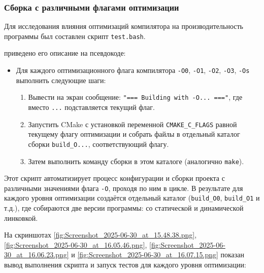 \subsubsection{Сборка с различными флагами оптимизации}

Для исследования влияния оптимизаций компилятора на производительность программы был составлен скрипт \texttt{test.bash}.

\vspace{.3cm}

 приведено его описание на псевдокоде:
\begin{itemize}
\item Для каждого оптимизационного флага компилятора \texttt{-O0}, \texttt{-O1}, \texttt{-O2}, \texttt{-O3}, \texttt{-Os} выполнить следующие шаги:
\begin{enumerate}
\item Вывести на экран сообщение: \texttt{"=== Building with -O... ==="}, где вместо \texttt{...} подставляется текущий флаг.
\item Запустить CMake с установкой переменной \texttt{CMAKE\_C\_FLAGS} равной текущему флагу оптимизации и собрать файлы в отдельный каталог сборки \texttt{build\_O...}, соответствующий флагу.
\item Затем выполнить команду сборки в этом каталоге (аналогично \texttt{make}).
\end{enumerate}
\end{itemize}

\noindent Этот скрипт автоматизирует процесс конфигурации и сборки проекта с различными значениями флага \texttt{-O}, проходя по ним в цикле. В результате для каждого уровня оптимизации создаётся отдельный каталог (\texttt{build\_O0}, \texttt{build\_O1} и т.д.), где собираются две версии программы: со статической и динамической линковкой.

На скриншотах \ref{fig:Screenshot_2025-06-30_at_15.48.38.png}, \ref{fig:Screenshot_2025-06-30_at_16.05.46.png}, \ref{fig:Screenshot_2025-06-30_at_16.06.23.png} и \ref{fig:Screenshot_2025-06-30_at_16.07.15.png} показан вывод выполнения скрипта и запуск тестов для каждого уровня оптимизации:




